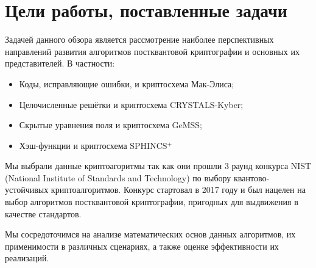 \section{Цели работы, поставленные задачи}

Задачей данного обзора является рассмотрение наиболее перспективных направлений развития алгоритмов постквантовой криптографии и основных их представителей. В частности:



\begin{itemize}
    \item Коды, исправляющие ошибки, и криптосхема Мак-Элиса;
    \item Целочисленные решётки и криптосхема CRYSTALS-Kyber;
    \item Скрытые уравнения поля и криптосхема GeMSS;
    \item Хэш-функции и криптосхема SPHINCS$^+$
\end{itemize}

Мы выбрали данные криптоагоритмы так как они прошли 3 раунд конкурса NIST (National Institute of Standards and Technology) по выбору квантово-устойчивых криптоалгоритмов. Конкурс стартовал в 2017 году и был нацелен на выбор алгоритмов постквантовой криптографии, пригодных для выдвижения в качестве стандартов. 

Мы сосредоточимся на анализе математических основ данных алгоритмов, их применимости в различных сценариях, а также оценке эффективности их реализаций.
\clearpage